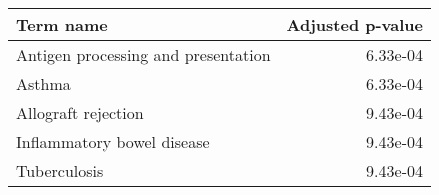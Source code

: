 \begin{tabular}{lr}
\toprule
                           Term name &  Adjusted p-value \\
\midrule
 Antigen processing and presentation &          6.33e-04 \\
                              Asthma &          6.33e-04 \\
                 Allograft rejection &          9.43e-04 \\
          Inflammatory bowel disease &          9.43e-04 \\
                        Tuberculosis &          9.43e-04 \\
\bottomrule
\end{tabular}
